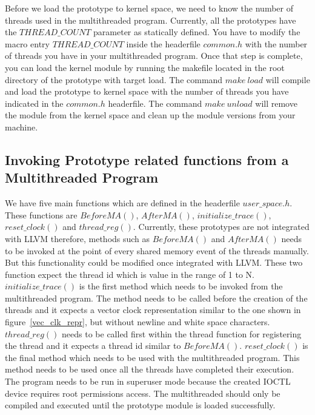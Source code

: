 Before we load the prototype to kernel space, we need to know the number of threads used in the multithreaded program. 
Currently, all the prototypes have the $THREAD\_COUNT$ parameter as statically defined. 
You have to modify the macro entry $THREAD\_COUNT$ inside the headerfile $common.h$ with the number of threads you have in your multithreaded program. 
Once that step is complete, you can load the kernel module by running the makefile located in the root directory of the prototype with target load. 
The command $make\ load$ will compile and load the prototype to kernel space with the number of threads you have indicated in the $common.h$ headerfile. 
The command $make\ unload$ will remove the module from the kernel space and clean up the module versions from your machine. 

\subsection*{Invoking Prototype related functions from a Multithreaded Program}

We have five main functions which are defined in the headerfile $user\_space.h$. 
These functions are $BeforeMA()$, $AfterMA()$, $initialize\_trace()$, $reset\_clock()$ and $thread\_reg()$. 
Currently, these prototypes are not integrated with LLVM therefore, methods such as $BeforeMA()$ and $AfterMA()$ needs to be invoked at the point of every shared memory event of the threads manually. 
But this functionality could be modified once integrated with LLVM. 
These two function expect the thread id which is value in the range of 1 to N. 
$initialize\_trace()$ is the first method which needs to be invoked from the multithreaded program. 
The method needs to be called before the creation of the threads and it expects a vector clock representation similar to the one shown in figure~\ref{vec_clk_repr}, but without newline and white space characters. 
$thread\_reg()$ needs to be called first within the thread function for registering the thread and it expects a thread id similar to $BeforeMA()$. 
$reset\_clock()$ is the final method which needs to be used with the multithreaded program. 
This method needs to be used once all the threads have completed their execution. 
The program needs to be run in superuser mode because the created IOCTL device requires root permissions access. 
The multithreaded should only be compiled and executed until the prototype module is loaded successfully.  




